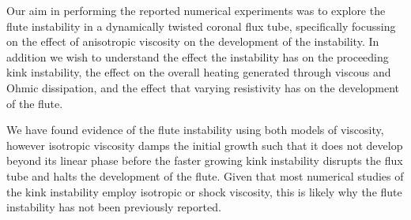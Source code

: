 \documentclass[fleqn,usenatbib]{mnras}
\newcommand{\rev}[1]{{\color{red} {#1}}}
\begin{document}
\rev{Our aim in performing the reported numerical experiments was to explore
the flute instability in a dynamically twisted coronal flux tube, specifically
focussing on the effect of anisotropic viscosity on the development of the
instability. In addition we wish to understand the effect the instability has
on the proceeding kink instability, the effect on the overall heating generated
through viscous and Ohmic dissipation, and the effect that varying resistivity
has on the development of the flute.}

\rev{We have found evidence of the flute instability using both models of
viscosity, however isotropic viscosity damps the initial growth such that it
does not develop beyond its linear phase before the faster growing kink
instability disrupts the flux tube and halts the development of the flute.
Given that most numerical studies of the kink instability employ isotropic or
shock viscosity, this is likely why the flute instability has not been
previously reported.}
\end{document}
